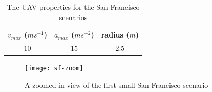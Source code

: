 \begin{table}[h]
\centering
\begin{tabular}{ c | c | c }
$v_{max}$ ($ms^{-1}$)	& $a_{max}$ ($ms^{-2}$) 	& radius ($m$) 	 \\
\hline
$10$ & $15$ 	& $2.5$ \\
\end{tabular}
\caption{The UAV properties for the San Francisco scenarios}
\label{table:uav-sf}
\end{table}

\begin{figure}[h]
	\centering
	\texttt{[image: sf-zoom]}
	\caption{A zoomed-in view of the first small San Francisco scenario}
	\label{fig:sf-zoom}
\end{figure}


\begin{figure}
	\centering
	

\end{figure}
